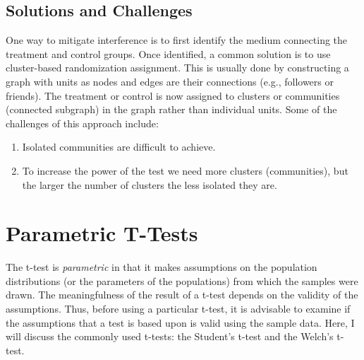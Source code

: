 \documentclass[10pt, aps,twocolumn, superscriptaddress, nofootinbib]{revtex4-2}
\begin{document}
\subsection{Solutions and Challenges}

One way to mitigate interference is to first identify the medium connecting the treatment and control groups. Once identified, a common solution is to use cluster-based randomization assignment. This is usually done by constructing a graph with units as nodes and edges are their connections (e.g., followers or friends). The treatment or control is now assigned to clusters or communities (connected subgraph) in the graph rather than individual units.  Some of the challenges of this approach  include:
\begin{enumerate}
 \item  Isolated communities are difficult to achieve. 
 \item To increase the power of the test we need more clusters (communities), but the larger the number of clusters the less isolated they are.

\end{enumerate}


\section{Parametric T-Tests}
The t-test is {\it parametric} in that it makes assumptions on the population distributions (or the parameters of the populations) from which the samples were drawn.  The meaningfulness of the result of a t-test depends on the validity of the assumptions. Thus,  before using a particular t-test,  it is advisable to examine if the assumptions that a test is based upon is valid using the sample data. Here, I will discuss the commonly used t-tests: the Student's t-test and the Welch's t-test.
\end{document}
